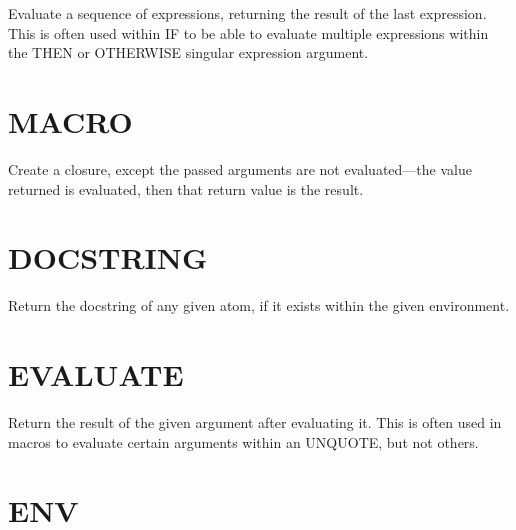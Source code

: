 \documentclass[
letterpaper,
oneside,
]{memoir}
\begin{document}
\noindent
Evaluate a sequence of expressions, returning the result of the last expression. This is often used within IF to be able to evaluate multiple expressions within the THEN or OTHERWISE singular expression argument.

\vspace{1em}

\section{MACRO}

\noindent
Create a closure, except the passed arguments are not evaluated---the value returned is evaluated, then that return value is the result.

\vspace{1em}

\section{DOCSTRING}

\noindent
Return the docstring of any given atom, if it exists within the given environment.

\vspace{1em}

\section{EVALUATE}

\noindent
Return the result of the given argument after evaluating it. This is often used in macros to evaluate certain arguments within an UNQUOTE, but not others.

\vspace{1em}

\section{ENV}
\end{document}
